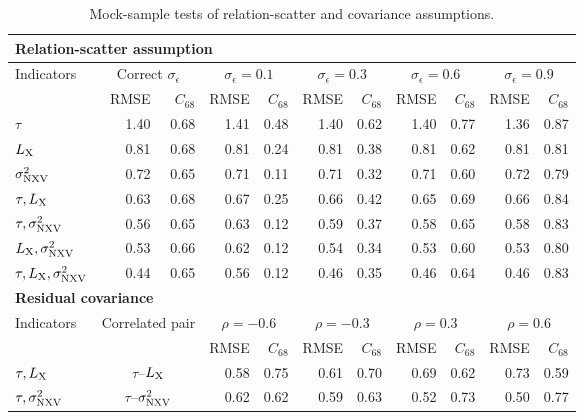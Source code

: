 \begin{table}[t]
\centering
\caption{Mock-sample tests of relation-scatter and covariance assumptions.}
\label{tabB}
\small
\renewcommand{\arraystretch}{1.08}
\setlength{\tabcolsep}{3pt}
\begin{tabular*}{\textwidth}{@{\extracolsep{\fill}}lrrrrrrrrrr@{}}
\multicolumn{11}{l}{\textbf{Relation-scatter assumption}} \\
\hline
Indicators & \multicolumn{2}{c}{Correct $\sigma_\epsilon$} & \multicolumn{2}{c}{$\sigma_\epsilon=0.1$} & \multicolumn{2}{c}{$\sigma_\epsilon=0.3$} & \multicolumn{2}{c}{$\sigma_\epsilon=0.6$} & \multicolumn{2}{c}{$\sigma_\epsilon=0.9$} \\
 & RMSE & $C_{68}$ & RMSE & $C_{68}$ & RMSE & $C_{68}$ & RMSE & $C_{68}$ & RMSE & $C_{68}$ \\
\hline
$\tau$ & 1.40 & 0.68 & 1.41 & 0.48 & 1.40 & 0.62 & 1.40 & 0.77 & 1.36 & 0.87 \\
$L_{\rm X}$ & 0.81 & 0.68 & 0.81 & 0.24 & 0.81 & 0.38 & 0.81 & 0.62 & 0.81 & 0.81 \\
$\sigma^2_{\rm NXV}$ & 0.72 & 0.65 & 0.71 & 0.11 & 0.71 & 0.32 & 0.71 & 0.60 & 0.72 & 0.79 \\
$\tau, L_{\rm X}$ & 0.63 & 0.68 & 0.67 & 0.25 & 0.66 & 0.42 & 0.65 & 0.69 & 0.66 & 0.84 \\
$\tau, \sigma^2_{\rm NXV}$ & 0.56 & 0.65 & 0.63 & 0.12 & 0.59 & 0.37 & 0.58 & 0.65 & 0.58 & 0.83 \\
$L_{\rm X}, \sigma^2_{\rm NXV}$ & 0.53 & 0.66 & 0.62 & 0.12 & 0.54 & 0.34 & 0.53 & 0.60 & 0.53 & 0.80 \\
$\tau, L_{\rm X}, \sigma^2_{\rm NXV}$ & 0.44 & 0.65 & 0.56 & 0.12 & 0.46 & 0.35 & 0.46 & 0.64 & 0.46 & 0.83 \\
\hline
\multicolumn{11}{l}{\textbf{Residual covariance}} \\
\hline
Indicators & \multicolumn{2}{c}{Correlated pair} & \multicolumn{2}{c}{$\rho=-0.6$} & \multicolumn{2}{c}{$\rho=-0.3$} & \multicolumn{2}{c}{$\rho=0.3$} & \multicolumn{2}{c}{$\rho=0.6$} \\
 & \multicolumn{2}{c}{} & RMSE & $C_{68}$ & RMSE & $C_{68}$ & RMSE & $C_{68}$ & RMSE & $C_{68}$ \\
\hline
$\tau, L_{\rm X}$ & \multicolumn{2}{c}{$\tau$--$L_{\rm X}$} & 0.58 & 0.75 & 0.61 & 0.70 & 0.69 & 0.62 & 0.73 & 0.59 \\
$\tau, \sigma^2_{\rm NXV}$ & \multicolumn{2}{c}{$\tau$--$\sigma^2_{\rm NXV}$} & 0.62 & 0.62 & 0.59 & 0.63 & 0.52 & 0.73 & 0.50 & 0.77 \\

\end{tabular*}
\end{table}
